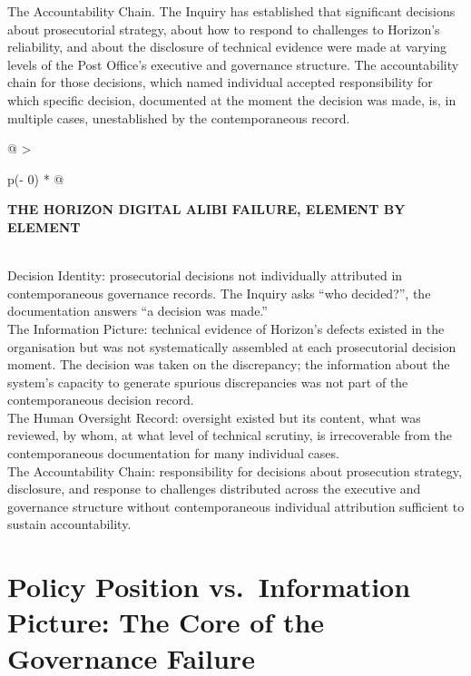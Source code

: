 The Accountability Chain. The Inquiry has established that significant decisions about prosecutorial strategy, about how to respond to challenges to Horizon's reliability, and about the disclosure of technical evidence were made at varying levels of the Post Office's executive and governance structure. The accountability chain for those decisions, which named individual accepted responsibility for which specific decision, documented at the moment the decision was made, is, in multiple cases, unestablished by the contemporaneous record.

\begin{longtable}[]{@{}
  >{\raggedright\arraybackslash}p{(\columnwidth - 0\tabcolsep) * }@{}}
\toprule\noalign{}
\begin{minipage}[b]{\linewidth}\raggedright
\textbf{THE HORIZON DIGITAL ALIBI FAILURE, ELEMENT BY ELEMENT}
\end{minipage} \\
\midrule\noalign{}
\endhead
\bottomrule\noalign{}
\endlastfoot
Decision Identity: prosecutorial decisions not individually attributed in contemporaneous governance records. The Inquiry asks ``who decided?'', the documentation answers ``a decision was made.'' \\
The Information Picture: technical evidence of Horizon's defects existed in the organisation but was not systematically assembled at each prosecutorial decision moment. The decision was taken on the discrepancy; the information about the system's capacity to generate spurious discrepancies was not part of the contemporaneous decision record. \\
The Human Oversight Record: oversight existed but its content, what was reviewed, by whom, at what level of technical scrutiny, is irrecoverable from the contemporaneous documentation for many individual cases. \\
The Accountability Chain: responsibility for decisions about prosecution strategy, disclosure, and response to challenges distributed across the executive and governance structure without contemporaneous individual attribution sufficient to sustain accountability. \\
\end{longtable}

\scenebreak

\section{Policy Position vs.~Information Picture: The Core of the Governance Failure}


